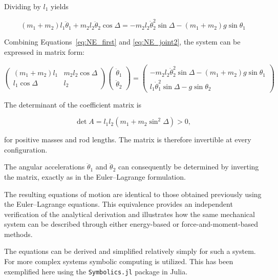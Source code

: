 Dividing by \(l_1\) yields

\begin{equation}
    \boxed{
    (m_1+m_2)l_1\ddot{\theta}_1
    +m_2l_2\ddot{\theta}_2\cos\Delta
    =
    -m_2l_2\dot{\theta}_2^2\sin\Delta
    -(m_1+m_2)g\sin\theta_1
    }
    \label{eq:NE_first}
\end{equation}

Combining Equations~\eqref{eq:NE_first} and \eqref{eq:NE_joint2}, the system can be expressed in matrix form:

\begin{equation}
    \boxed{
    \begin{pmatrix}
        (m_1+m_2)l_1 & m_2l_2\cos\Delta\\
        l_1\cos\Delta & l_2
    \end{pmatrix}
    \begin{pmatrix}
        \ddot{\theta}_1\\
        \ddot{\theta}_2
    \end{pmatrix}
    =
    \begin{pmatrix}
        -m_2l_2\dot{\theta}_2^2\sin\Delta
        -(m_1+m_2)g\sin\theta_1\\
        l_1\dot{\theta}_1^2\sin\Delta
        -g\sin\theta_2
    \end{pmatrix}
    }
    \label{eq:NE_matrix}
\end{equation}

The determinant of the coefficient matrix is

\begin{equation}
    \det A
    =
    l_1l_2\left(m_1+m_2\sin^2\Delta\right)>0,
\end{equation}

for positive masses and rod lengths. The matrix is therefore invertible at every configuration.

The angular accelerations \(\ddot{\theta}_1\) and \(\ddot{\theta}_2\) can consequently be determined by inverting the matrix, exactly as in the Euler--Lagrange formulation.

The resulting equations of motion are identical to those obtained previously using the Euler--Lagrange equations. This equivalence provides an independent verification of the analytical derivation and illustrates how the same mechanical system can be described through either energy-based or force-and-moment-based methods.

The equations can be derived and simplified relatively simply for such a system. For more complex systems symbolic computing is utilized. This has been exemplified here using the \texttt{Symbolics.jl} package in Julia.

